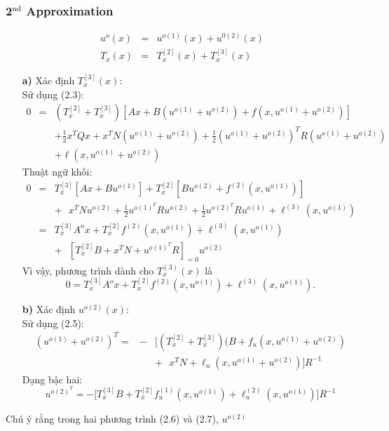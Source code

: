 \documentclass[12pt,a4paper]{report}
\begin{document}
\subsubsection{2$^\text{nd}$ Approximation}
\begin{eqnarray}
	u^o(x) &=& u^{o(1)}(x) + u^{0(2)}(x)\nonumber \\ T_x(x) &=& T_x^{[2]}(x) + T_x^{[3]}(x) \nonumber
\end{eqnarray}
\begin{itemize}
	\item[\textbf{a)}] Xác định $T_x^{[3]}(x)$: \\ Sử dụng (2.3): \begin{eqnarray}
		0 &=& (T_x^{[2]} + T_x^{[3]})[Ax + B(u^{o(1)} + u^{o(2)}) + f(x, u^{o(1)} + u^{o(2)})] \nonumber \\ && + \frac{1}{2}x^TQx + x^TN(u^{o(1)} + u^{o(2)}) + \frac{1}{2}(u^{o(1)} + u^{o(2)})^TR(u^{o(1)} + u^{o(2)}) \nonumber \\ && + \ell(x, u^{o(1)} + u^{o(2)}) \nonumber
	\end{eqnarray} Thuật ngữ khối: \begin{eqnarray}
		0 &=& T_x^{[3]}[Ax+Bu^{o(1)}] + T_x^{[2]}[Bu^{o(2)}+f^{(2)}(x, u^{o(1)})] \nonumber \\ && + \text{ } x^TNu^{o(2)} + \frac{1}{2}u^{o(1)^T}Ru^{o(2)} + \frac{1}{2}u^{o(2)^T}Ru^{o(1)} + \ell^{(3)}(x, u^{o(1)}) \nonumber \\ &=& T_x^{[3]}A^ox + T_x^{[2]}f^{(2)}(x, u^{o(1)}) + \ell^{(3)}(x, u^{o(1)}) \nonumber \\ && + \text{ } [T_x^{[2]}B + x^TN + u^{o(1)^T}R]_{=0}u^{o(2)} \nonumber
	\end{eqnarray}
	 Vì vậy, phương trình dành cho $T_x^{(3)}(x)$ là \begin{equation}
	 	0 = T_x^{[3]}A^ox + T_x^{[2]}f^{(2)}(x, u^{o(1)}) + \ell^{(3)}(x, u^{o(1)}).
	 \end{equation}
\item[\textbf{b)}] Xác định $u^{o(2)}(x)$:\\
Sử dụng (2.5): \begin{eqnarray}
	(u^{o(1)} + u^{o(2)})^T = &-& \Big[(T_x^{[2]} + T_x^{[3]})(B+f_u(x, u^{o(1)} + u^{o(2)}) \nonumber \\ && + \text{ } x^TN + \ell_u(x, u^{o(1)} + u^{o(2)})\Big]R^{-1} \nonumber
\end{eqnarray}
Dạng bậc hai: \begin{equation}
	u^{o(2)^T} = - \Big[T_x^{[3]}B + T_x^{[2]}f_u^{(1)}(x, u^{o(1)}) + \ell_u^{(2)}(x, u^{o(1)})\Big]R^{-1}
\end{equation}
\end{itemize}
Chú ý rằng trong hai phương trình (2.6) và (2.7), $u^{o(2)}$ 
\end{document}
